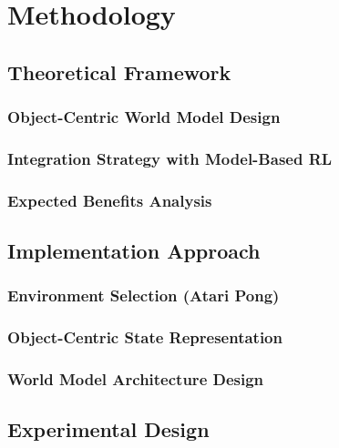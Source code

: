 \documentclass[
	english,
	ruledheaders=section,
	class=report,
	thesis={type=master},
	accentcolor=9c,
	custommargins=true,
	marginpar=false,
	parskip=half-,
	fontsize=11pt,
]{tudapub}
\begin{document}
\chapter{Methodology}
\label{chap:methodology}

\section{Theoretical Framework}
\label{sec:framework}

\subsection{Object-Centric World Model Design}
\label{subsec:oc_world_model}

\subsection{Integration Strategy with Model-Based RL}
\label{subsec:integration_strategy}

\subsection{Expected Benefits Analysis}
\label{subsec:benefits_analysis}

\section{Implementation Approach}
\label{sec:implementation_approach}

\subsection{Environment Selection (Atari Pong)}
\label{subsec:env_selection}

\subsection{Object-Centric State Representation}
\label{subsec:state_representation}

\subsection{World Model Architecture Design}
\label{subsec:architecture_design}

\section{Experimental Design}
\label{sec:experimental_design}
\end{document}
